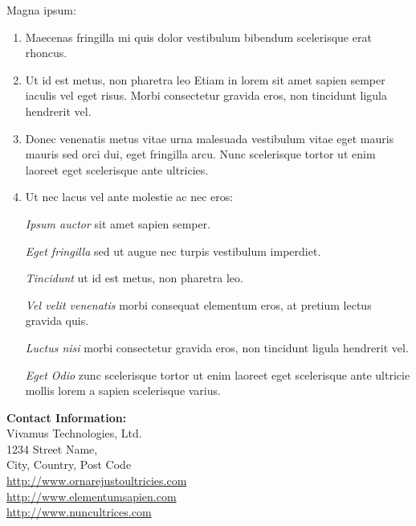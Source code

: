 \documentclass[10pt]{article} %
\begin{document}
\begin{minipage}[t]{.30\linewidth} %


\begin{mdframed}[style=sidebar,frametitle={}] %


Magna ipsum:

\begin{enumerate}
\item Maecenas fringilla mi quis dolor vestibulum bibendum scelerisque erat rhoncus.
\item Ut id est metus, non pharetra leo Etiam in lorem sit amet sapien semper iaculis vel eget risus. Morbi consectetur gravida eros, non tincidunt ligula hendrerit vel.
\item Donec venenatis metus vitae urna malesuada vestibulum vitae eget mauris mauris sed orci dui, eget fringilla arcu. Nunc scelerisque tortor ut enim laoreet eget scelerisque ante ultricies.
\item Ut nec lacus vel ante molestie ac nec eros:

\textsl{Ipsum auctor} sit amet sapien semper.

\textsl{Eget fringilla} sed ut augue nec turpis vestibulum imperdiet.

\textsl{Tincidunt} ut id est metus, non pharetra leo.

\textsl{Vel velit venenatis } morbi consequat elementum eros, at pretium lectus gravida quis.

\textsl{Luctus nisi} morbi consectetur gravida eros, non tincidunt ligula hendrerit vel.

\textsl{Eget Odio} zunc scelerisque tortor ut enim laoreet eget scelerisque ante ultricie mollis lorem a sapien scelerisque varius.
\end{enumerate}

\BackToContents %

\end{mdframed}\hfill


\centering
\begin{minipage}[t]{.95\linewidth}
\textbf{Contact Information:}\\
Vivamus Technologies, Ltd.\\
1234 Street Name,\\
City, Country, Post Code\\
\href{http://www.example.com}{http://www.ornarejustoultricies.com}\\
\href{http://www.example.com}{http://www.elementumsapien.com}\\
\href{http://www.example.com}{http://www.nuncultrices.com} 
\end{minipage}


\end{minipage}
\end{document}
